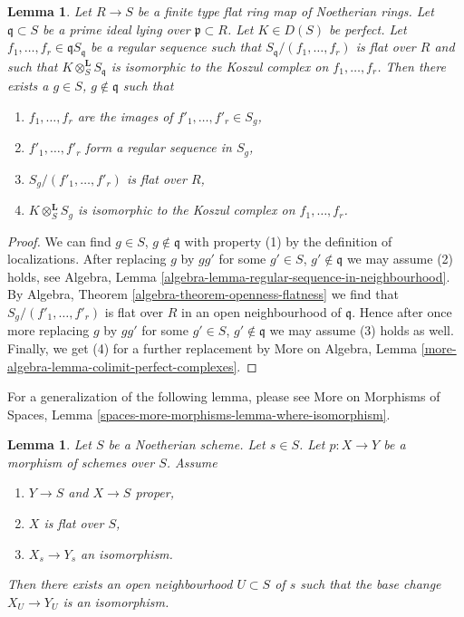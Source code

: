 \documentclass{stacks-project}
\theoremstyle{plain}
\newtheorem{lemma}[subsection]{Lemma}
\theoremstyle{definition}
\theoremstyle{remark}
\numberwithin{equation}{subsection}
\begin{document}
\begin{lemma}
\label{lemma-limit-arguments}
Let $R \to S$ be a finite type flat ring map of Noetherian rings.
Let $\mathfrak q \subset S$ be a prime ideal lying over
$\mathfrak p \subset R$. Let $K \in D(S)$ be perfect.
Let $f_1, \ldots, f_r \in \mathfrak q S_\mathfrak q$
be a regular sequence such that $S_\mathfrak q/(f_1, \ldots, f_r)$
is flat over $R$ and such that
$K \otimes_S^\mathbf{L} S_\mathfrak q$ is isomorphic to the
Koszul complex on $f_1, \ldots, f_r$. Then there exists a
$g \in S$, $g \not \in \mathfrak q$ such that
\begin{enumerate}
\item $f_1, \ldots, f_r$ are the images of
$f'_1, \ldots, f'_r \in S_g$,
\item $f'_1, \ldots, f'_r$ form a regular sequence in $S_g$,
\item $S_g/(f'_1, \ldots, f'_r)$ is flat over $R$,
\item $K \otimes_S^\mathbf{L} S_g$ is isomorphic to the
Koszul complex on $f_1, \ldots, f_r$.
\end{enumerate}
\end{lemma}

\begin{proof}
We can find $g \in S$, $g \not \in \mathfrak q$ with property (1) by
the definition of localizations. After replacing $g$ by
$gg'$ for some $g' \in S$, $g' \not \in \mathfrak q$
we may assume (2) holds, see
Algebra, Lemma \ref{algebra-lemma-regular-sequence-in-neighbourhood}.
By Algebra, Theorem \ref{algebra-theorem-openness-flatness}
we find that $S_g/(f'_1, \ldots, f'_r)$ is flat over $R$
in an open neighbourhood of $\mathfrak q$.
Hence after once more replacing $g$ by $gg'$ for some
$g' \in S$, $g' \not \in \mathfrak q$ we may assume (3) holds as well.
Finally, we get (4) for a further replacement by
More on Algebra, Lemma \ref{more-algebra-lemma-colimit-perfect-complexes}.
\end{proof}

\noindent
For a generalization of the following lemma, please see
More on Morphisms of Spaces, Lemma
\ref{spaces-more-morphisms-lemma-where-isomorphism}.

\begin{lemma}
\label{lemma-isomorphism-in-neighbourhood}
Let $S$ be a Noetherian scheme. Let $s \in S$.
Let $p : X \to Y$ be a morphism of schemes over $S$.
Assume
\begin{enumerate}
\item $Y \to S$ and $X \to S$ proper,
\item $X$ is flat over $S$,
\item $X_s \to Y_s$ an isomorphism.
\end{enumerate}
Then there exists an open neighbourhood $U \subset S$ of $s$
such that the base change $X_U \to Y_U$ is an isomorphism.
\end{lemma}
\end{document}
